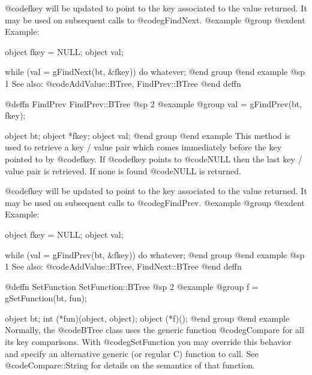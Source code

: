 @code{fkey} will be updated to point to the key associated to the value
returned.  It may be used on subsequent calls to @code{gFindNext}.
@example
@group
@exdent Example:

object  fkey = NULL;
object  val;

while (val = gFindNext(bt, &fkey))
     do whatever;
@end group
@end example
@sp 1
See also:  @code{AddValue::BTree, FindPrev::BTree}
@end deffn





















@deffn {FindPrev} FindPrev::BTree
@sp 2
@example
@group
val = gFindPrev(bt, fkey);

object  bt;
object  *fkey;
object  val;
@end group
@end example
This method is used to retrieve a key / value pair which comes
immediately before the key pointed to by @code{fkey}.  If @code{fkey}
points to @code{NULL} then the last key / value pair is retrieved.  If
none is found @code{NULL} is returned.

@code{fkey} will be updated to point to the key associated to the value
returned.  It may be used on subsequent calls to @code{gFindPrev}.
@example
@group
@exdent Example:

object  fkey = NULL;
object  val;

while (val = gFindPrev(bt, &fkey))
     do whatever;
@end group
@end example
@sp 1
See also:  @code{AddValue::BTree, FindNext::BTree}
@end deffn














@deffn {SetFunction} SetFunction::BTree
@sp 2
@example
@group
f = gSetFunction(bt, fun);

object  bt;
int     (*fun)(object, object);
object  (*f)();
@end group
@end example
Normally, the @code{BTree} class uses the generic function
@code{gCompare} for all its key comparisons.  With @code{gSetFunction}
you may override this behavior and specify an alternative generic (or
regular C) function to call.  See @code{Compare::String} for details
on the semantics of that function.

